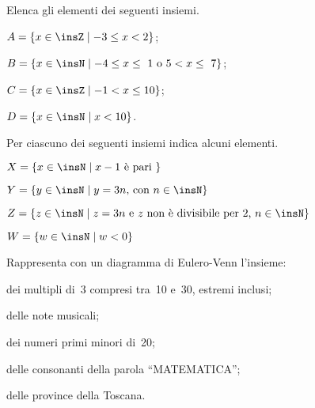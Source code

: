 \begin{esercizio}
\label{ese:5.31}
Elenca gli elementi dei seguenti insiemi.
\begin{multicols}{2}
\begin{enumeratea}
\item $A=\{x\in\insZ\mid -3\le x<2\}$;
\item $B=\{x\in\insN\mid -4\le x\le~1\text{ o }5<x\le~7\}$;
\item $C=\{x\in\insZ\mid -1< x\le 10\}$;
\item $D=\{x\in\insN\mid x<10\}$.
\end{enumeratea}
\end{multicols}
\end{esercizio}

\begin{esercizio}
\label{ese:5.32}
Per ciascuno dei seguenti insiemi indica alcuni elementi.
\TabPositions{6cm}
\begin{enumeratea}
\item $X=\{x\in\insN\mid x-1\text{ è pari }\}$\dotfill
\item $Y=\{y\in\insN\mid y=3n\text{, con } n\in\insN\}$\dotfill
\item $Z=\{z\in\insN\mid z=3n\text{ e } z\text{ non è divisibile per~2, }n\in\insN\}$\dotfill
\item $W=\{w\in\insN\mid w<0\}$\dotfill
\end{enumeratea}
\end{esercizio}

\begin{esercizio}
\label{ese:5.33}
Rappresenta con un diagramma di Eulero-Venn l'insieme:
\begin{enumeratea}
\item dei multipli di~3 compresi tra~10 e~30, estremi inclusi;
\item delle note musicali;
\item dei numeri primi minori di~20;
\item delle consonanti della parola ``MATEMATICA'';
\item delle province della Toscana.
\end{enumeratea}
\end{esercizio}

